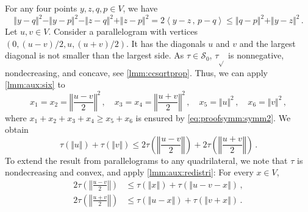 \documentclass{article}
\newcommand{\lb}{\left(} %
\newcommand{\rb}{\right)} %
\newcommand{\br}[1]{\lb #1 \rb} %
\newcommand{\brOf}[1]{\!\br{#1}} %
\newcommand*{\mc}[1]{\mathcal{#1}}
\newcommand{\innerProduct}[2]{\left\langle#1\,,\, #2\right\rangle}
\newcommand{\ip}[2]{\innerProduct{#1}{#2}}
\newcommand{\normof}[1]{\Vert #1 \Vert}
\newcommand{\normOf}[1]{\left\Vert #1 \right\Vert}
\newcommand{\equationFullstop}{\, .}
\newcommand{\eqfs}{\equationFullstop}
\newcommand{\equationComma}{\, ,}
\newcommand{\eqcm}{\equationComma}
\newcommand{\tran}{\tau}
\newcommand{\trans}{\tran_{\!\sqrt{}}}
\newcommand{\setcco}{\mc S_0}
\begin{document}
\begin{appendix}
For any four points $y, z, q, p\in V$, we have 
\begin{equation}\label{eq:proofsymm:symm2}
	\normof{y-q}^2  - \normof{y-p}^2 - \normof{z-q}^2 + \normof{z-p}^2 
	= 
	2 \ip{y-z}{p-q} 
	\leq 
	\normof{q-p}^2 + \normof{y-z}^2
	\eqfs
\end{equation}
Let $u, v \in V$. Consider a parallelogram with vertices $(0, (u-v)/2, u, (u+v)/2)$. It has the diagonals $u$ and $v$ and the largest diagonal is not smaller than the largest side.
As $\tran\in\setcco$, $\trans$ is nonnegative, nondecreasing, and concave, see \cref{lmm:ccsqrtprop}. Thus, we can apply \cref{lmm:aux:six} to
\begin{equation}
	x_1 = x_2 = \normOf{\frac{u-v}2}^2\eqcm\quad
	x_3 = x_4 = \normOf{\frac{u+v}2}^2\eqcm\quad
	x_5 = \normof{u}^2\eqcm\quad
	x_6 = \normof{v}^2\eqcm
\end{equation}
where $x_1+x_2+x_3+x_4 \geq x_5+x_6$ is ensured by \eqref{eq:proofsymm:symm2}.
We obtain
\begin{equation}
	\tran(\normof{u})  + \tran(\normof{v}) \leq 2\tran\brOf{\normOf{\frac{u-v}2}} + 2\tran\brOf{\normOf{\frac{u+v}2}}
	\eqfs
\end{equation}
To extend the result from parallelograms to any quadrilateral, we note that $\tran$ is nondecreasing and convex, and apply \cref{lmm:aux:redistri}:
For every $x\in V$, 
\begin{align}
	2\tran\brOf{\normOf{\frac{u-v}2}} &\leq \tran\brOf{\normOf{x}} + \tran\brOf{\normOf{u-v-x}}\eqcm\\
	2\tran\brOf{\normOf{\frac{u+v}2}} &\leq \tran\brOf{\normOf{u-x}} + \tran\brOf{\normOf{v+x}}
	\eqfs
\end{align}%
\begin{figure}%
	\begin{center}
\end{center}
\end{figure}
\end{appendix}
\end{document}
